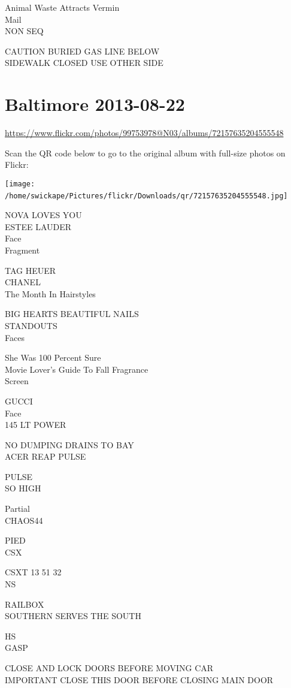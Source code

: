 \documentclass[10pt,letterpaper]{article}
\begin{document}
Animal Waste Attracts Vermin\\
Mail\\
NON SEQ

CAUTION BURIED GAS LINE BELOW\\
SIDEWALK CLOSED USE OTHER SIDE
\

\section*{Baltimore 2013-08-22}

\url{https://www.flickr.com/photos/99753978@N03/albums/72157635204555548}

Scan the QR code below to go to the original album with full-size photos on Flickr:

\texttt{[image: /home/swickape/Pictures/flickr/Downloads/qr/72157635204555548.jpg]}
\

NOVA LOVES YOU\\
ESTEE LAUDER\\
Face\\
Fragment

TAG HEUER\\
CHANEL\\
The Month In Hairstyles

BIG HEARTS BEAUTIFUL NAILS\\
STANDOUTS\\
Faces

She Was 100 Percent Sure\\
Movie Lover's Guide To Fall Fragrance\\
Screen

GUCCI\\
Face\\
145 LT POWER

NO DUMPING DRAINS TO BAY\\
ACER REAP PULSE

PULSE\\
SO HIGH

Partial\\
CHAOS44

PIED\\
CSX

CSXT 13 51 32\\
NS

RAILBOX\\
SOUTHERN SERVES THE SOUTH

HS\\
GASP

CLOSE AND LOCK DOORS BEFORE MOVING CAR\\
IMPORTANT CLOSE THIS DOOR BEFORE CLOSING MAIN DOOR
\end{document}
